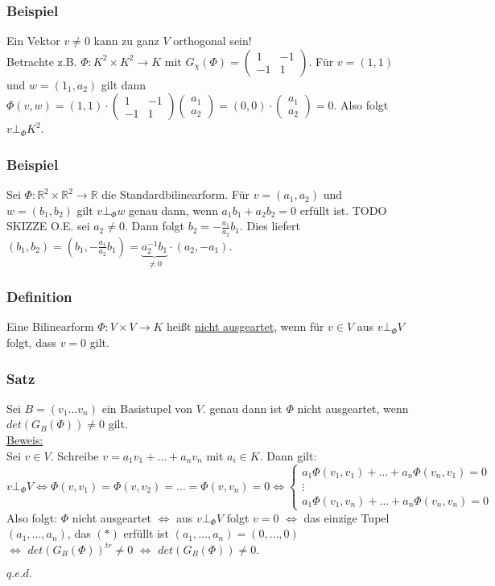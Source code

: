 \documentclass[a4paper]{article}
\newcommand{\ul}{\underline}
\renewcommand{\proof}{\ul{Beweis:}\\}
\renewcommand{\qed}{\begin{flushright}
\ul{\(q.e.d.\)}
\end{flushright}}
\begin{document}
\subsubsection{Beispiel}
Ein Vektor \(v\neq 0\) kann zu ganz \(V\) orthogonal sein!\\
Betrachte z.B. \(\Phi:K^2\times K^2\rightarrow K\) mit \(G_\chi(\Phi)=\begin{pmatrix}
1 & -1\\
-1 & 1
\end{pmatrix}\).
Für \(v=(1,1)\) und \(w=(1_1,a_2)\) gilt dann \(\Phi(v,w)=(1,1)\cdot\begin{pmatrix}
1 & -1\\
-1 & 1
\end{pmatrix}\begin{pmatrix}
a_1\\
a_2
\end{pmatrix}=(0,0)\cdot\begin{pmatrix}
a_1\\
a_2
\end{pmatrix}=0\). Also folgt \(v\bot_\Phi K^2\).
\subsubsection{Beispiel}
Sei \(\Phi:\mathbb{R}^2\times\mathbb{R}^2\rightarrow\mathbb{R}\) die Standardbilinearform. Für \(v=(a_1,a_2)\) und \(w=(b_1,b_2)\) gilt \(v\bot_\Phi w\) genau dann, wenn \(a_1b_1+a_2b_2=0\) erfüllt ist. TODO SKIZZE
O.E. sei \(a_2\neq 0\). Dann folgt \(b_2=-\frac{a_1}{a_2}b_1\). Dies liefert \((b_1,b_2)=(b_1,-\frac{a_1}{a_2}b_1)=\underbrace{a_2^{-1}b_1}_{\neq 0}\cdot(a_2,-a_1)\).
\subsubsection{Definition}
Eine Bilinearform \(\Phi:V\times V\rightarrow K\) heißt \ul{nicht ausgeartet}, wenn für \(v\in V\) aus \(v\bot_\Phi V\) folgt, dass \(v=0\) gilt.
\subsubsection{Satz}
Sei \(B=(v_1\dots v_n)\) ein Basistupel von \(V\). genau dann ist \(\Phi\) nicht ausgeartet, wenn \(det(G_B(\Phi))\neq 0\) gilt.\\
\proof
Sei \(v\in V\). Schreibe \(v=a_1v_1+\dots+a_nv_n\) mit \(a_i\in K\). Dann gilt: \(v\bot_\Phi V\Leftrightarrow \Phi(v,v_1)=\Phi(v,v_2)=\dots=\Phi(v,v_n)=0\Leftrightarrow \begin{cases}
a_1\Phi(v_1,v_1)+\dots+a_n\Phi(v_n,v_1)=0\\
\vdots\\
a_1\Phi(v_1,v_n)+\dots+a_n\Phi(v_n,v_n)=0
\end{cases}\)\\
Also folgt: \(\Phi\) nicht ausgeartet \(\Leftrightarrow\) aus \(v\bot_\Phi V\) folgt \(v=0\) \(\Leftrightarrow\) das einzige Tupel \((a_1,\dots,a_n)\), das \((*)\) erfüllt ist \((a_1,\dots,a_n)=(0,\dots,0)\)\\
\(\Leftrightarrow\) \(det(G_B(\Phi))^{tr}\neq 0\) \(\Leftrightarrow\) \(det(G_B(\Phi))\neq 0\).
\qed
\end{document}
